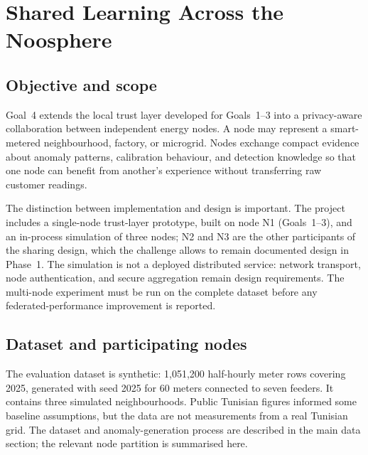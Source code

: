 
\section{Shared Learning Across the Noosphere}
\label{sec:goal4-shared}

\subsection{Objective and scope}
Goal~4 extends the local trust layer developed for Goals~1--3 into a privacy-aware collaboration between independent energy nodes. A node may represent a smart-metered neighbourhood, factory, or microgrid. Nodes exchange compact evidence about anomaly patterns, calibration behaviour, and detection knowledge so that one node can benefit from another's experience without transferring raw customer readings.

The distinction between implementation and design is important. The project includes a single-node trust-layer prototype, built on node N1 (Goals~1--3), and an in-process simulation of three nodes; N2 and N3 are the other participants of the sharing design, which the challenge allows to remain documented design in Phase~1. The simulation is not a deployed distributed service: network transport, node authentication, and secure aggregation remain design requirements. The multi-node experiment must be run on the complete dataset before any federated-performance improvement is reported.

\subsection{Dataset and participating nodes}
The evaluation dataset is synthetic: 1,051,200 half-hourly meter rows covering 2025, generated with seed 2025 for 60 meters connected to seven feeders. It contains three simulated neighbourhoods. Public Tunisian figures informed some baseline assumptions, but the data are not measurements from a real Tunisian grid. The dataset and anomaly-generation process are described in the main data section; the relevant node partition is summarised here.

